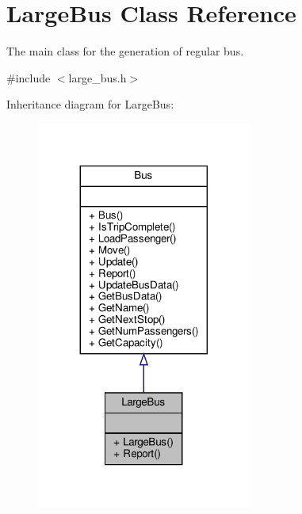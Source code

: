 \hypertarget{classLargeBus}{}\section{Large\+Bus Class Reference}
\label{classLargeBus}


The main class for the generation of regular bus.  




{\ttfamily \#include $<$large\+\_\+bus.\+h$>$}



Inheritance diagram for Large\+Bus\+:\nopagebreak
\begin{figure}[H]
\begin{center}
\leavevmode
\includegraphics[width=200pt]{classLargeBus__inherit__graph}
\end{center}
\end{figure}


